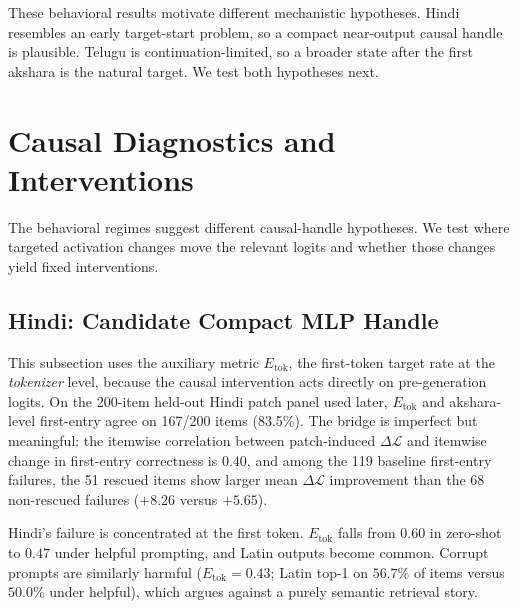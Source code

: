 \documentclass{article}
\begin{document}
These behavioral results motivate different mechanistic hypotheses. Hindi resembles an early target-start problem, so a compact near-output causal handle is plausible. Telugu is continuation-limited, so a broader state after the first akshara is the natural target. We test both hypotheses next.

\section{Causal Diagnostics and Interventions}\label{sec:mech}

The behavioral regimes suggest different causal-handle hypotheses. We test where targeted activation changes move the relevant logits and whether those changes yield fixed interventions.

\subsection{Hindi: Candidate Compact MLP Handle}

This subsection uses the auxiliary metric $E_{\mathrm{tok}}$, the first-token target rate at the \emph{tokenizer} level, because the causal intervention acts directly on pre-generation logits. On the 200-item held-out Hindi patch panel used later, $E_{\mathrm{tok}}$ and akshara-level first-entry agree on 167/200 items (83.5\%). The bridge is imperfect but meaningful: the itemwise correlation between patch-induced $\Delta \mathcal{L}$ and itemwise change in first-entry correctness is $0.40$, and among the 119 baseline first-entry failures, the 51 rescued items show larger mean $\Delta \mathcal{L}$ improvement than the 68 non-rescued failures ($+8.26$ versus $+5.65$).

Hindi's failure is concentrated at the first token. $E_{\mathrm{tok}}$ falls from $0.60$ in zero-shot to $0.47$ under helpful prompting, and Latin outputs become common. Corrupt prompts are similarly harmful ($E_{\mathrm{tok}}{=}0.43$; Latin top-1 on $56.7\%$ of items versus $50.0\%$ under helpful), which argues against a purely semantic retrieval story.
\end{document}
